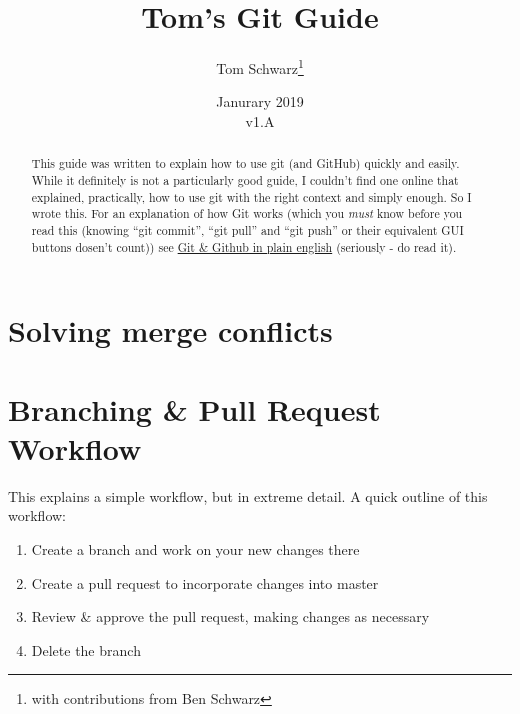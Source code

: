 \documentclass[11pt, titlepage]{article}
\title{Tom's Git Guide}
\author{Tom Schwarz\thanks{with contributions from Ben Schwarz}}
\date{Janurary 2019\\v1.A} %
\begin{document}
\maketitle

\tableofcontents

\renewcommand{\abstractname}{Introduction} %
\begin{abstract}
This guide was written to explain how to use git (and GitHub) quickly and easily. While it definitely is not a particularly good guide, I couldn't find one online that explained, practically, how to use git with the right context and simply enough. So I wrote this. For an explanation of how Git works (which you \emph{must} know before you read this (knowing ``git commit'', ``git pull'' and ``git push'' or their equivalent GUI buttons dosen't count)) see \href{https://blog.red-badger.com/2016/11/29/gitgithub-in-plain-english}{Git \& Github in plain english} (seriously - do read it).
\end{abstract}

\section{Solving merge conflicts}
\label{sec:solving_merge_conflicts}

\section{Branching \& Pull Request Workflow}
\label{sec:branching_pull_request_workflow}
This explains a simple workflow, but in extreme detail. A quick outline of this workflow:
\begin{enumerate}
	\item Create a branch and work on your new changes there
	\item Create a pull request to incorporate changes into master
	\item Review \& approve the pull request, making changes as necessary
	\item Delete the branch
\end{enumerate}
\end{document}
